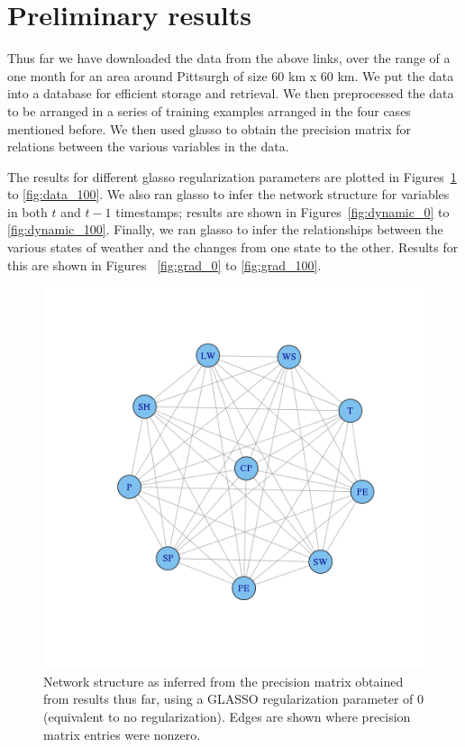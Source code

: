 \documentclass{article}
\begin{document}
\section{Preliminary results}

Thus far we have downloaded the data from the above links, over the range of a
one month for an area around Pittsurgh of size 60 km x 60 km. We put the data
into a database for efficient storage and retrieval. We then preprocessed the
data to be arranged in a series of training examples arranged in the four cases
mentioned before. We then used glasso to obtain the precision matrix for
relations between the various variables in the data.

The results for different glasso regularization parameters are plotted in
Figures~\ref{fig:data_0} to \ref{fig:data_100}. We also ran glasso to infer the
network structure for variables in both $t$ and $t - 1$ timestamps; results are
shown in Figures~\ref{fig:dynamic_0} to \ref{fig:dynamic_100}. Finally, we ran
glasso to infer the relationships between the various states of weather and the
changes from one state to the other. Results for this are shown in Figures~
\ref{fig:grad_0} to \ref{fig:grad_100}.

\begin{figure}
\includegraphics[width=0.9\columnwidth]{images/data_0.png}
\caption{Network structure as inferred from the precision matrix obtained from results thus far, using a GLASSO regularization parameter of 0 (equivalent to no regularization). Edges are shown where precision matrix entries were nonzero.}
\label{fig:data_0}
\end{figure}
\end{document}
